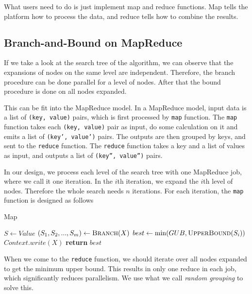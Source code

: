What users need to do is just implement map and reduce functions. Map tells the platform how to process the data, and reduce tells how to combine the results.

\subsection{Branch-and-Bound on MapReduce}
    If we take a look at the search tree of the algorithm, we can observe that the expansions of nodes on the same level are independent. Therefore, the branch procedure can be done parallel for a level of nodes. After that the bound procedure is done on all nodes expanded.

    This can be fit into the MapReduce model. In a MapReduce model, input data is a list of \texttt{(key, value)} pairs, which is first processed by \texttt{map} function. The \texttt{map} function takes each \texttt{(key, value)} pair as input, do some calculation on it and emits a list of \texttt{(key', value')} pairs. The outputs are then grouped by keys, and sent to the \texttt{reduce} function. The \texttt{reduce} function takes a key and a list of values as input, and outputs a list of \texttt{(key'', value'')} pairs.

    In our design, we process each level of the search tree with one MapReduce job, where we call it one iteration. In the $i$th iteration, we expand the $i$th level of nodes. Therefore the whole search needs $n$ iterations. For each iteration, the \texttt{map} function is designed as follows
\begin{algorithm}
\caption{Map}
\begin{algorithmic}[1]
    \State $S \gets Value$
    \State $(S_1,S_2,...,S_m) \gets \textsc{Branch}(X)$
        \State $best \gets \min(GUB, \textsc{UpperBound}(S_i))$
    \EndFor
            \State $Context.write(X)$
        \EndIf
    \EndFor
    \State \textbf{return }$best$
\EndFunction
\end{algorithmic}
\end{algorithm}
\newpage

    When we come to the \texttt{reduce} function, we should iterate over all nodes expanded to get the minimum upper bound. This results in only one reduce in each job, which significantly {\color{red} reduces} parallelism. We use what we call \textit{random grouping} to solve this.


